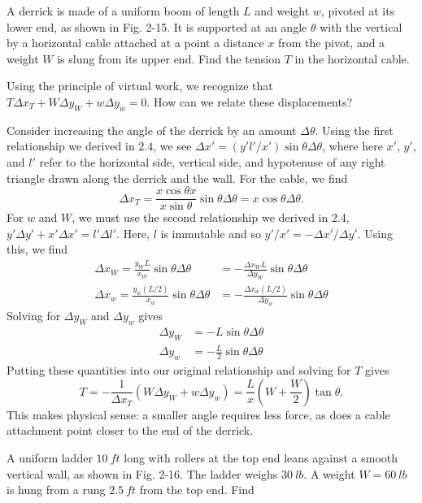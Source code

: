 \documentclass[../feynman-lectures-on-physics.tex]{subfiles}
\begin{document}
\begin{questions}
\question A derrick is made of a uniform boom of length $L$ and weight $w$, pivoted at its lower end, as shown in Fig. 2-15. It is supported at an angle $\theta$ with the vertical by a horizontal cable attached at a point a distance $x$ from the pivot, and a weight $W$ is slung from its upper end. Find the tension $T$ in the horizontal cable.

\begin{solution}
	Using the principle of virtual work, we recognize that $T\Delta{x}_T + W\Delta{y_W} + w\Delta{y_w} = 0$. How can we relate these displacements?

	Consider increasing the angle of the derrick by an amount $\Delta\theta$. Using the first relationship we derived in $2.4$, we see $\Delta{x'} = (y'l'/x')\sin\theta\Delta\theta$, where here $x'$, $y'$, and $l'$ refer to the horizontal side, vertical side, and hypotenuse of any right triangle drawn along the derrick and the wall. For the cable, we find
	\[
	\Delta{x_T} = \frac{x\cos\theta{x}}{x\sin\theta}\sin\theta\Delta\theta = x\cos\theta\Delta\theta.
	\] 
	For $w$ and $W$, we must use the second relationship we derived in 2.4, $y'\Delta{y'} + x'\Delta{x}' = l'\Delta{l'}$. Here, $l$ is immutable and so $y'/x' = -\Delta{x}'/\Delta{y'}$. Using this, we find
	\begin{align}
		\Delta{x_W} = \frac{y_WL}{x_W}\sin\theta\Delta\theta &= -\frac{\Delta{x_W}L}{\Delta{y_W}}\sin\theta\Delta\theta \\
		\Delta{x_w} = \frac{y_w(L/2)}{x_w}\sin\theta\Delta\theta &= -\frac{\Delta{x_w}{(L/2)}}{\Delta{y_w}}\sin\theta\Delta\theta
	\end{align}
	Solving for $\Delta{y_W}$ and $\Delta{y_w}$ gives
	\begin{align}
		\Delta{y_W} &= -L\sin\theta\Delta\theta \\
		\Delta{y_w} &= -\frac{L}{2}\sin\theta\Delta\theta
	\end{align}
	Putting these quantities into our original relationship and solving for $T$ gives
	\[
	T = -\frac{1}{\Delta{x_T}}(W\Delta{y_W} + w\Delta{y_w}) = \frac{L}{x}(W + \frac{W}{2})\tan\theta.
	\] 
	This makes physical sense: a smaller angle requires less force, as does a cable attachment point closer to the end of the derrick.
\end{solution}

\question A uniform ladder $\SI{10}{ft}$ long with rollers at the top end leans against a smooth vertical wall, as shown in Fig. 2-16. The ladder weighs $\SI{30}{lb}$. A weight $W = \SI{60}{lb}$ is hung from a rung $\SI{2.5}{ft}$ from the top end. Find
\begin{parts}

\end{parts}
\end{questions}
\end{document}
